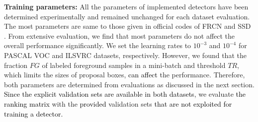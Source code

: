 \documentclass[10pt,twocolumn,letterpaper]{article}
\newcommand{\RE}{\textcolor{black}}
\newcommand{\RV}{\textcolor{black}}
\begin{document}
%




\textbf{Training parameters:} 
All the parameters of implemented detectors have been determined experimentally and remained unchanged for each dataset evaluation. The most parameters are same to those given in official codes of FRCN \cite{RenHGS15_NIPS15} and SSD \cite{LiuAESRFB_ECCV16}. From extensive evaluation, we find that most parameters do not affect the overall performance significantly. We set the learning rates to $10^{-3}$ and $10^{-4}$ for PASCAL VOC and ILSVRC datasets, respectively. However, we found that the fraction $FG$  of labeled foreground samples in a mini-batch and threshold $TR$, which limits the sizes of proposal boxes, \RE{can affect} the performance.  Therefore, both parameters are determined from evaluations as discussed in the next section.  \RV{Since the explicit validation sets are available in both datasets}, we evaluate \RV{the ranking matrix} with the \RV{provided} validation sets \RV{that are not exploited for training a detector.}





\end{document}
